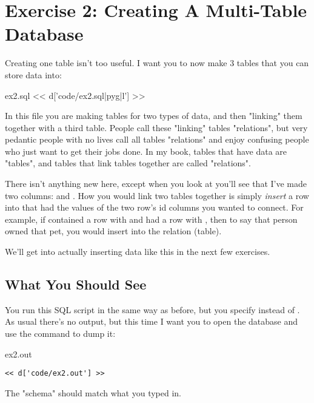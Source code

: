 \chapter{Exercise 2: Creating A Multi-Table Database}

Creating one table isn't too useful.  I want you to now make 3 tables that 
you can store data into:

\begin{code}{ex2.sql}
<< d['code/ex2.sql|pyg|l'] >>
\end{code}

In this file you are making tables for two types of data, and then
"linking" them together with a third table.  People call these 
"linking" tables "relations", but very pedantic people with no
lives call all tables "relations" and enjoy confusing people who
just want to get their jobs done.  In my book, tables that have data
are "tables", and tables that link tables together are called "relations".

There isn't anything new here, except when you look at 
you'll see that I've made two columns:  and .
How you would link two tables together is simply \emph{insert} a row
into  that had the values of the two row's id columns
you wanted to connect.  For example, if  contained a row with
 and  had a row with , then to say
that person owned that pet, you would insert 
into the  relation (table).

We'll get into actually inserting data like this in the next few exercises.

\section{What You Should See}

You run this SQL script in the same way as before, but you specify
 instead of .  As usual there's no output,
but this time I want you to open the database and use the 
 command to dump it:

\begin{code}{ex2.out}
\begin{Verbatim}
<< d['code/ex2.out'] >>
\end{Verbatim}
\end{code}

The "schema" should match what you typed in.

